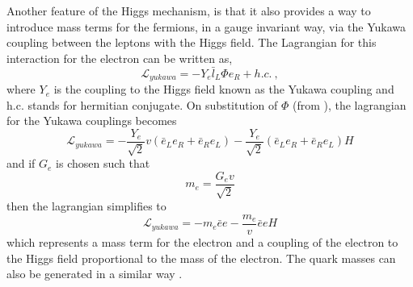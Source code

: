 Another feature of the Higgs mechanism, is that it also provides a way to
introduce mass terms for the fermions, in a gauge invariant way, via the Yukawa
coupling between the leptons with the Higgs field. The Lagrangian for this
interaction for the electron can be written as, 
\begin{equation}
\mathcal{L}_{yukawa} = -Y_{e}\bar{l}_L\Phi e_R + h.c. \ ,
\end{equation}
where $Y_{e}$ is the coupling to the Higgs field known as the Yukawa coupling
and h.c. stands for hermitian conjugate. On substitution of $\Phi$ (from
\EquationRef{}), the lagrangian for the Yukawa couplings becomes
\begin{equation}
\mathcal{L}_{yukawa} = 
-\frac{Y_{e}}{\sqrt{2}} v
(\bar{e}_L e_R + \bar{e}_R e_L)
-\frac{Y_{e}}{\sqrt{2}}
(\bar{e}_L e_R + \bar{e}_R e_L)H
\end{equation}
and if $G_e$ is chosen such that
\begin{equation}
m_{e} = \frac{G_{e}v}{\sqrt{2}}
\end{equation}
then the lagrangian simplifies to
\begin{equation}
\mathcal{L}_{yukawa} = 
- m_e \bar{e}e
- \frac{m_e}{v} \bar{e}e H
\end{equation}
which represents a mass term for the electron and a coupling of the electron to
the Higgs field proportional to the mass of the electron.
The quark masses can also be generated in a similar way \cite{halzen}.


